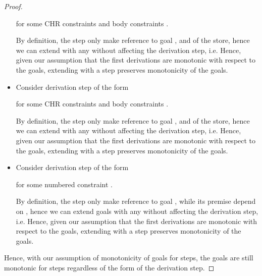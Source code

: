 \documentclass{tlp}
\begin{document}
\begin{proof}
\begin{itemize}
	        for some CHR constraints  and body constraints .
	        
	        By definition, the  step only make reference to goal , and  of the
	        store, hence we can extend  with any  without affecting the derivation step, i.e.
	           \goaltrans 
	        \eda
	        Hence, given our assumption that the first  derivations are monotonic with respect
          to the goals,	extending with a   step preserves monotonicity
          of the goals. 
	  \item {} Consider  derivation step of the form 
	        
	        for some CHR constraints  and body constraints .
	        
	        By definition, the  step only make reference to goal , and  of the
	        store, hence we can extend  with any  without affecting the derivation step, i.e.
	           \goaltrans 
	        \eda
	        Hence, given our assumption that the first  derivations are monotonic with respect
          to the goals,	extending with a   step preserves monotonicity
          of the goals. 
	  \item {} Consider  derivation step of the form 
	        
	        for some numbered constraint .
	        
	        By definition, the  step only make reference to goal , while its 
	        premise depend on , hence we can extend goals  with any  without
	        affecting the derivation step, i.e.
	           \goaltrans 
	        \eda
	        Hence, given our assumption that the first  derivations are monotonic with respect
          to the goals,	extending with a   step preserves monotonicity
          of the goals. 
  \end{itemize}
  Hence, with our assumption of monotonicity of goals for  steps, the goals are still monotonic for
	 steps regardless of the form of the  derivation step.
\end{proof}
\end{document}
